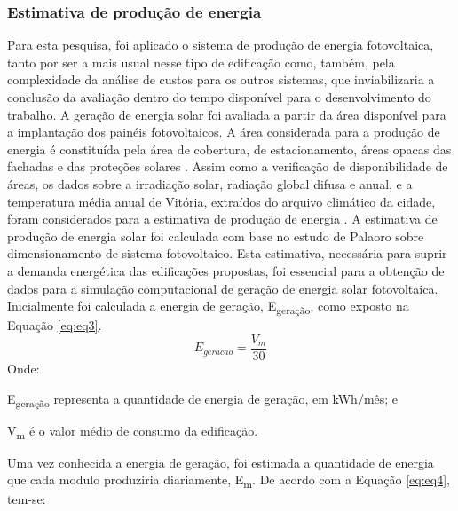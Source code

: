 \subsubsection{Estimativa de produção de energia}
\noindent Para esta pesquisa, foi aplicado o sistema de produção de energia fotovoltaica, tanto por ser a mais usual nesse tipo de edificação como, também, pela complexidade da análise de custos para os outros sistemas, que inviabilizaria a conclusão da avaliação dentro do tempo disponível para o desenvolvimento do trabalho.\vspace*{0.3cm} \newline
\noindent A geração de energia solar foi avaliada a partir da área disponível para a implantação dos painéis fotovoltaicos. A área considerada para a produção de energia é constituída pela área de cobertura, de estacionamento, áreas opacas das fachadas e das proteções solares \cite{Didone2014}. Assim como a verificação de disponibilidade de áreas, os dados sobre a irradiação solar, radiação global difusa e anual, e a temperatura média anual de Vitória, extraídos do arquivo climático da cidade, foram considerados para a estimativa de produção de energia \cite{InstitutoNacionaldeMetereologia-INMET2018,Pereira2017}.\vspace*{0.3cm} \newline
\noindent A estimativa de produção de energia solar foi calculada com base no estudo de Palaoro \citeyear{Palaoro2019} sobre dimensionamento de sistema  fotovoltaico. Esta estimativa, necessária para suprir a demanda energética das edificações propostas, foi essencial para a obtenção  de dados para a simulação computacional de geração de energia solar fotovoltaica.\vspace*{0.3cm} \newline
\noindent Inicialmente foi calculada a energia de geração, E\textsubscript{geração}, como exposto na Equação \ref{eq:eq3}.
\begin{equation}\label{eq:eq3}
E_{geracao}=\frac{V_m}{30}
\end{equation}
\noindent Onde:\par
\setlength\parindent{1.5cm} E\textsubscript{geração} representa a quantidade de energia de geração, em kWh/mês; e\par
\setlength\parindent{1.5cm} V\textsubscript{m} é o valor médio de consumo da edificação.\par
\noindent Uma vez conhecida a energia de geração, foi estimada a quantidade de energia que cada modulo produziria diariamente, E\textsubscript{m}. De acordo com a Equação \ref{eq:eq4}, tem-se:
